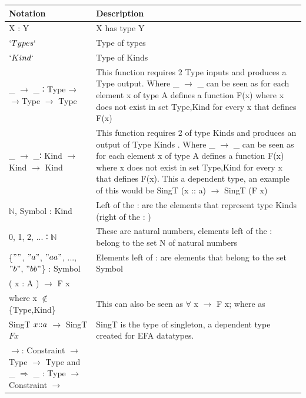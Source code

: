 \documentclass[12pt]{report}
\begin{document}
{\begin{longtable}{|m{5cm}|m{9cm}| }
    \hline 
    \textbf{Notation}  & \textbf{Description} \\ \hline
       X : Y   &  X has type Y \\ 
        \hline  
       $`Types`$  &  Type of types \\ 
        \hline
       $`Kind`$   &  Type of Kinds \\ 
        \hline
         \_ $\rightarrow$ \_ ∶ Type →$\rightarrow$Type $\rightarrow$ Type  & 
         This function requires 2 Type inputs and produces a Type output. Where 
         \_ $\rightarrow$ \_ can be seen as for each element x of type A 
         defines a function F(x) where x does not exist in set {Type,Kind} for 
         every x that defines F(x)  \\ 
        \hline
       \_ $\rightarrow$ \_∶ Kind $\rightarrow$Kind $\rightarrow$ Kind  & This 
       function requires 2 of type Kinds and produces an output of Type Kinds . 
       Where 
       \_ $\rightarrow$ \_ can be seen as for each element x of type A 
       defines a function F(x) where x does not exist in set {Type,Kind} for 
       every x that defines F(x). This a dependent type, an example of this 
       would be 
       SingT (x :: a) $\rightarrow$ SingT (F x)
       \\ 
        \hline
          $\mathbb{N}$, Symbol : Kind   &  Left of the : are the elements that 
          represent type Kinds (right of the : )\\ 
        \hline
          0, 1, 2, $...$ ∶ $\mathbb{N}$   &  These are natural numbers, 
          elements left of the : belong to the set N of natural numbers\\ 
        \hline
         \{$""$, $"a"$, $"aa"$, $...$, $"b"$, $"bb"$\} : Symbol &  
         Elements left of : are elements that belong to the set Symbol \\ 
        \hline
        ( x : A  ) $\rightarrow$ F x   & \\ where x $\notin$ \{Type,Kind\}   &  
        This can also be seen as $\forall$ x $\rightarrow$ F x; where as  \\ 
        \hline
           SingT \(x $::$ a\) $\rightarrow$ SingT \(F x\)  &  SingT is the type 
           of singleton, a dependent type created for EFA datatypes. \\ 
        \hline
          $\rightarrow$: Constraint $\rightarrow$ Type $\rightarrow$ Type  and  
          \_ $\Rightarrow$ \_ : Type $\rightarrow$ Constraint $\rightarrow$ 

\end{longtable}}
\end{document}
